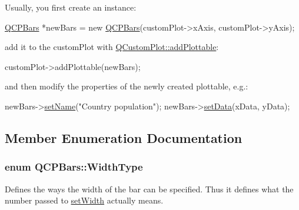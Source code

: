 Usually, you first create an instance\+: 
\begin{DoxyCode}
\hyperlink{class_q_c_p_bars}{QCPBars} *newBars = \textcolor{keyword}{new} \hyperlink{class_q_c_p_bars_a64006999ad9dff308f40df41cef176ad}{QCPBars}(customPlot->xAxis, customPlot->yAxis);
\end{DoxyCode}
 add it to the custom\+Plot with \hyperlink{class_q_custom_plot_ab7ad9174f701f9c6f64e378df77927a6}{Q\+Custom\+Plot\+::add\+Plottable}\+: 
\begin{DoxyCode}
customPlot->addPlottable(newBars);
\end{DoxyCode}
 and then modify the properties of the newly created plottable, e.\+g.\+: 
\begin{DoxyCode}
newBars->\hyperlink{class_q_c_p_abstract_plottable_ab79c7ba76bc7fa89a4b3580e12149f1f}{setName}(\textcolor{stringliteral}{"Country population"});
newBars->\hyperlink{class_q_c_p_bars_aa3435aab19e0a49e4e7b41bd36a8d96b}{setData}(xData, yData);
\end{DoxyCode}
 

\subsection{Member Enumeration Documentation}
\hypertarget{class_q_c_p_bars_a65dbbf1ab41cbe993d71521096ed4649}{}
\subsubsection[{Width\+Type}]{\setlength{\rightskip}{0pt plus 5cm}enum {\bf Q\+C\+P\+Bars\+::\+Width\+Type}}\label{class_q_c_p_bars_a65dbbf1ab41cbe993d71521096ed4649}
Defines the ways the width of the bar can be specified. Thus it defines what the number passed to \hyperlink{class_q_c_p_bars_afec6116579d44d5b706e0fa5e5332507}{set\+Width} actually means.

